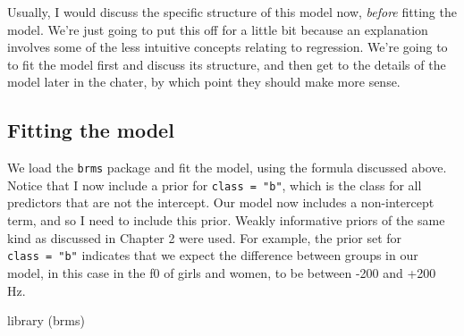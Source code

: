 \documentclass[
]{book}
\newenvironment{Shaded}{\begin{snugshade}}{\end{snugshade}}
\newcommand{\FunctionTok}[1]{\textcolor[rgb]{0.00,0.00,0.00}{#1}}
\newcommand{\NormalTok}[1]{#1}
\begin{document}
Usually, I would discuss the specific structure of this model now, \emph{before} fitting the model. We're just going to put this off for a little bit because an explanation involves some of the less intuitive concepts relating to regression. We're going to to fit the model first and discuss its structure, and then get to the details of the model later in the chater, by which point they should make more sense.

\hypertarget{fitting-the-model-1}{%
\subsection{Fitting the model}\label{fitting-the-model-1}}

We load the \texttt{brms} package and fit the model, using the formula discussed above. Notice that I now include a prior for \texttt{class\ =\ "b"}, which is the class for all predictors that are not the intercept. Our model now includes a non-intercept term, and so I need to include this prior. Weakly informative priors of the same kind as discussed in Chapter 2 were used. For example, the prior set for \texttt{class\ =\ "b"} indicates that we expect the difference between groups in our model, in this case in the f0 of girls and women, to be between -200 and +200 Hz.

\begin{Shaded}
\begin{Highlighting}[]
\FunctionTok{library}\NormalTok{ (brms)}
\end{Highlighting}
\end{Shaded}
\end{document}
